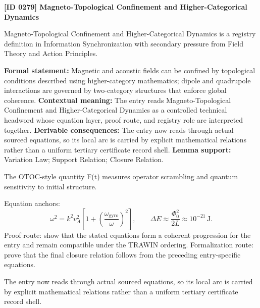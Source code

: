 \clearpage
\noindent\textbf{[ID 0279] Magneto-Topological Confinement and Higher-Categorical Dynamics}\par
\vspace{0.35em}
\begingroup\small
{}
Magneto-Topological Confinement and Higher-Categorical Dynamics is a registry definition in Information Synchronization with secondary pressure from Field Theory and Action Principles.

\begingroup\footnotesize\setlength{\emergencystretch}{3em}\sloppy
\textbf{Formal statement:} Magnetic and acoustic fields can be confined by topological conditions described using higher-category mathematics; dipole and quadrupole interactions are governed by two-category structures that enforce global coherence. \textbf{Contextual meaning:} The entry reads Magneto-Topological Confinement and Higher-Categorical Dynamics as a controlled technical headword whose equation layer, proof route, and registry role are interpreted together. \textbf{Derivable consequences:} The entry now reads through actual sourced equations, so its local arc is carried by explicit mathematical relations rather than a uniform tertiary certificate record shell. \textbf{Lemma support:} Variation Law; Support Relation; Closure Relation.\par
\endgroup

The OTOC-style quantity F(t) measures operator scrambling and quantum sensitivity to initial structure.

Equation anchors:
\[
\omega^2=k^2v_A^2\left[1+\left(\frac{\omega_{\mathrm{gyro}}}{\omega}\right)^2\right],
\qquad
\Delta E\approx\frac{\Phi_0^2}{2L}\approx10^{-21}\,\mathrm{J}.
\]
Proof route: show that the stated equations form a coherent progression for the entry and remain compatible under the TRAWIN ordering. Formalization route: prove that the final closure relation follows from the preceding entry-specific equations.

The entry now reads through actual sourced equations, so its local arc is carried by explicit mathematical relations rather than a uniform tertiary certificate record shell.
\endgroup

